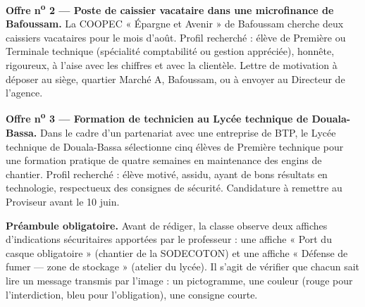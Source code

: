 \documentclass[11pt]{article}
\newcounter{popsec}
\newcounter{popsub}
\newcommand{\courssub}[1]{%
  \stepcounter{popsub}%
  \par\vspace{9pt}\noindent{\popxbold\fontsize{11.5}{13}\selectfont\color{popink}{\color{poporange}\thepopsec.\thepopsub}\hspace{6pt}#1}\par\nopagebreak\vspace{4pt}
}
\begin{document}
\textbf{Offre n\textsuperscript{o} 2 --- Poste de caissier vacataire dans une microfinance de Bafoussam.} La COOPEC « Épargne et Avenir » de Bafoussam cherche deux caissiers vacataires pour le mois d'août. Profil recherché : élève de Première ou Terminale technique (spécialité comptabilité ou gestion appréciée), honnête, rigoureux, à l'aise avec les chiffres et avec la clientèle. Lettre de motivation à déposer au siège, quartier Marché A, Bafoussam, ou à envoyer au Directeur de l'agence.

\textbf{Offre n\textsuperscript{o} 3 --- Formation de technicien au Lycée technique de Douala-Bassa.} Dans le cadre d'un partenariat avec une entreprise de BTP, le Lycée technique de Douala-Bassa sélectionne cinq élèves de Première technique pour une formation pratique de quatre semaines en maintenance des engins de chantier. Profil recherché : élève motivé, assidu, ayant de bons résultats en technologie, respectueux des consignes de sécurité. Candidature à remettre au Proviseur avant le 10 juin.

\textbf{Préambule obligatoire.} Avant de rédiger, la classe observe deux affiches d'indications sécuritaires apportées par le professeur : une affiche « Port du casque obligatoire » (chantier de la SODECOTON) et une affiche « Défense de fumer --- zone de stockage » (atelier du lycée). Il s'agit de vérifier que chacun sait lire un message transmis par l'image : un pictogramme, une couleur (rouge pour l'interdiction, bleu pour l'obligation), une consigne courte.

\courssub{Consignes}
\end{document}
